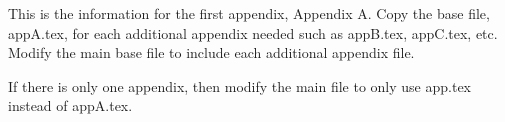%
%

This is the information for the first appendix, Appendix A. Copy the base file, appA.tex, for each additional appendix needed such as appB.tex, appC.tex, etc. Modify the main base file to include each additional appendix file.

If there is only one appendix, then modify the main file to only use app.tex instead of appA.tex.
